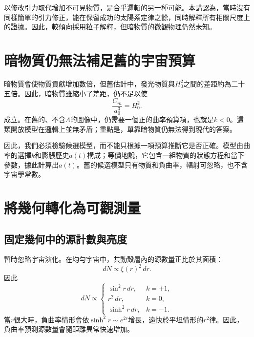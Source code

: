 以修改引力取代增加不可見物質，是合乎邏輯的另一種可能。本講認為，當時沒有同樣簡單的引力修正，能在保留成功的太陽系定律之餘，同時解釋所有相關尺度上的證據。因此，較傾向採用粒子解釋，但暗物質的微觀物理仍然未知。

\section{暗物質仍無法補足舊的宇宙預算}

暗物質會使物質貢獻增加數倍，但舊估計中，發光物質與\(H_0^2\)之間的差距約為二十五倍。因此，暗物質雖縮小了差距，仍不足以使
\begin{equation}
\frac{C_m}{a_0^3}=H_0^2.
\end{equation}
成立。在舊的、不含\(\Lambda\)的圖像中，仍需要一個正的曲率預算項，也就是\(k<0\)。這類開放模型在邏輯上並無矛盾；重點是，單靠暗物質仍無法得到現代的答案。

\begin{classroomqa}
\end{classroomqa}

因此，我們必須檢驗候選模型，而不能只根據一項預算推斷它是否正確。模型由曲率的選擇\(k\)和膨脹歷史\(a(t)\)構成；等價地說，它包含一組物質的狀態方程和當下參數，據此計算出\(a(t)\)。舊的候選模型只有物質和負曲率，輻射可忽略，也不含宇宙學常數。

\section{將幾何轉化為可觀測量}

\subsection{固定幾何中的源計數與亮度}

暫時忽略宇宙演化。在均勻宇宙中，共動殼層內的源數量正比於其面積：
\begin{equation}
dN\propto \xi(r)^2\,dr.
\label{eq:c06-shell-count}
\end{equation}
因此
\begin{equation}
dN\propto
\begin{cases}
\sin^2r\,dr, & k=+1,\\
r^2\,dr, & k=0,\\
\sinh^2r\,dr, & k=-1.
\end{cases}
\end{equation}
當\(r\)很大時，負曲率情形會依\(\sinh^2r\sim e^{2r}\)增長，遠快於平坦情形的\(r^2\)律。因此，負曲率預測源數量會隨距離異常快速增加。

